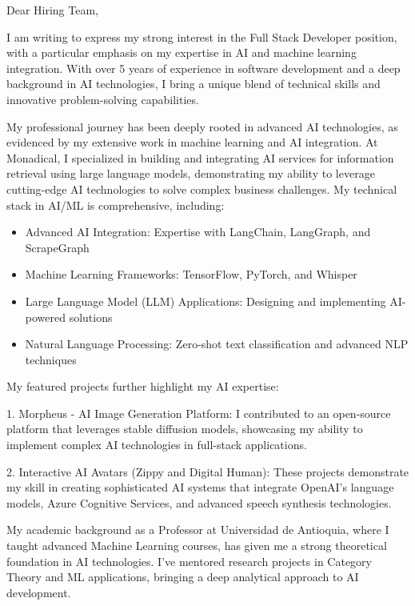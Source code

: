 \documentclass[11pt]{letter}
\begin{document}
\begin{letter}{}
\opening{Dear Hiring Team,}

I am writing to express my strong interest in the Full Stack Developer position, with a particular emphasis on my expertise in AI and machine learning integration. With over 5 years of experience in software development and a deep background in AI technologies, I bring a unique blend of technical skills and innovative problem-solving capabilities.

My professional journey has been deeply rooted in advanced AI technologies, as evidenced by my extensive work in machine learning and AI integration. At Monadical, I specialized in building and integrating AI services for information retrieval using large language models, demonstrating my ability to leverage cutting-edge AI technologies to solve complex business challenges. My technical stack in AI/ML is comprehensive, including:

\begin{itemize}
    \item Advanced AI Integration: Expertise with LangChain, LangGraph, and ScrapeGraph
    \item Machine Learning Frameworks: TensorFlow, PyTorch, and Whisper
    \item Large Language Model (LLM) Applications: Designing and implementing AI-powered solutions
    \item Natural Language Processing: Zero-shot text classification and advanced NLP techniques
\end{itemize}

My featured projects further highlight my AI expertise:

1. Morpheus - AI Image Generation Platform: I contributed to an open-source platform that leverages stable diffusion models, showcasing my ability to implement complex AI technologies in full-stack applications.

2. Interactive AI Avatars (Zippy and Digital Human): These projects demonstrate my skill in creating sophisticated AI systems that integrate OpenAI's language models, Azure Cognitive Services, and advanced speech synthesis technologies.

My academic background as a Professor at Universidad de Antioquia, where I taught advanced Machine Learning courses, has given me a strong theoretical foundation in AI technologies. I've mentored research projects in Category Theory and ML applications, bringing a deep analytical approach to AI development.


\end{letter}
\end{document}
